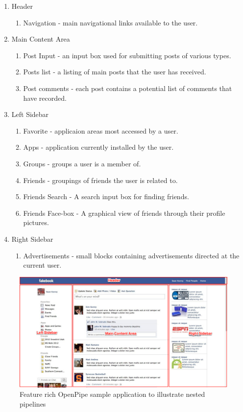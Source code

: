 \documentclass[12pt]{report}
\begin{document}
\begin{enumerate}
  \item Header
	\begin{enumerate}
		\item Navigation - main navigational links available to the user.
	\end{enumerate}
  \item Main Content Area
	\begin{enumerate}
		\item Post Input - an input box used for submitting posts of various types.
		\item Posts list - a listing of main posts that the user has received.
		\item Post comments - each post contains a potential list of comments that have recorded.
	\end{enumerate}
  \item Left Sidebar
	\begin{enumerate}
		\item Favorite - applicaion areas most accessed by a user.
		\item Apps - application currently installed by the user.
		\item Groups - groups a user is a member of.
		\item Friends - groupings of friends the user is related to.
		\item Friends Search - A search input box for finding friends.
		\item Friends Face-box - A graphical view of friends through their profile pictures.
	\end{enumerate}
  \item Right Sidebar
	\begin{enumerate}
		\item Advertisements - small blocks containing advertisements directed at the current user.
	\end{enumerate}
\end{enumerate}


\begin{figure}[H]
\centering
\includegraphics[width=\textwidth,keepaspectratio]{figures/images/sample_app_with_overlay.png}
\caption{Feature rich OpenPipe sample application to illustrate nested pipelines}
\label{fig:sampleApp}
\end{figure}
\end{document}
